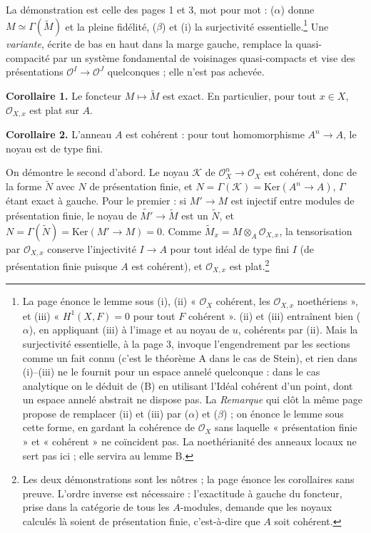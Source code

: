 \documentclass[11pt,a4paper]{article}
\begin{document}
La démonstration est celle des pages 1 et 3, mot pour mot : ($\alpha$) donne
$M \simeq \Gamma(\widetilde{M})$ et la pleine fidélité, ($\beta$) et (i) la
surjectivité essentielle.\footnote{La page énonce le lemme sous (i), (ii)
« $\mathcal{O}_{X}$ cohérent, les $\mathcal{O}_{X,x}$ noethériens », et (iii)
« $H^{1}(X, F) = 0$ pour tout $F$ cohérent ». (ii) et (iii) entraînent bien
($\alpha$), en appliquant (iii) à l'image et au noyau de $u$, cohérents par
(ii). Mais la surjectivité essentielle, à la page 3, invoque l'engendrement
par les sections comme un fait connu (c'est le théorème A dans le cas de
Stein), et rien dans (i)--(iii) ne le fournit pour un espace annelé
quelconque : dans le cas analytique on le déduit de (B) en utilisant l'Idéal
cohérent d'un point, dont un espace annelé abstrait ne dispose pas. La
\emph{Remarque} qui clôt la même page propose de remplacer (ii) et
(iii) par ($\alpha$) et ($\beta$) ; on énonce le lemme sous cette forme, en
gardant la cohérence de $\mathcal{O}_{X}$ sans laquelle « présentation finie »
et « cohérent » ne coïncident pas. La noethérianité des anneaux locaux ne sert
pas ici ; elle servira au lemme B.} Une \emph{variante}, écrite de bas en haut
dans la marge gauche, remplace la quasi-compacité par un système fondamental
de voisinages quasi-compacts et vise des présentations
$\mathcal{O}^{I} \to \mathcal{O}^{J}$ quelconques ; elle n'est pas achevée.

\textbf{Corollaire 1.} Le foncteur $M \mapsto \widetilde{M}$ est exact. En
particulier, pour tout $x \in X$, $\mathcal{O}_{X,x}$ est plat sur $A$.

\textbf{Corollaire 2.} L'anneau $A$ est cohérent : pour tout homomorphisme
$A^{n} \to A$, le noyau est de type fini.

On démontre le second d'abord. Le noyau $\mathcal{K}$ de
$\mathcal{O}_{X}^{n} \to \mathcal{O}_{X}$ est cohérent, donc de la forme
$\widetilde{N}$ avec $N$ de présentation finie, et
$N = \Gamma(\mathcal{K}) = \mathrm{Ker}(A^{n} \to A)$, $\Gamma$ étant exact à
gauche. Pour le premier : si $M' \to M$ est injectif entre modules de
présentation finie, le noyau de $\widetilde{M'} \to \widetilde{M}$ est un
$\widetilde{N}$, et $N = \Gamma(\widetilde{N}) = \mathrm{Ker}(M' \to M) = 0$.
Comme $\widetilde{M}_{x} = M \otimes_{A} \mathcal{O}_{X,x}$, la tensorisation
par $\mathcal{O}_{X,x}$ conserve l'injectivité $I \to A$ pour tout idéal de
type fini $I$ (de présentation finie puisque $A$ est cohérent), et
$\mathcal{O}_{X,x}$ est plat.\footnote{Les deux démonstrations sont les
nôtres ; la page énonce les corollaires sans preuve. L'ordre inverse est
nécessaire : l'exactitude à gauche du foncteur, prise dans la catégorie de
tous les $A$-modules, demande que les noyaux calculés là soient de présentation
finie, c'est-à-dire que $A$ soit cohérent.}
\end{document}
